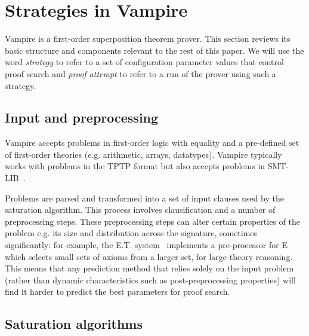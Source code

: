 \documentclass{llncs}
\begin{document}
\section{Strategies in Vampire}
\label{sec:vampire}
%
Vampire is a first-order superposition theorem prover. 
This section reviews its basic structure and components relevant to the rest of this paper. 
We will use the word \textit{strategy} to refer to a set of configuration parameter values that control proof search and \textit{proof attempt} to refer to a run of the prover using such a strategy.

\subsection{Input and preprocessing}

Vampire accepts problems in first-order logic with equality and a pre-defined set of first-order theories (e.g. arithmetic, arrays, datatypes). Vampire typically works with problems in the TPTP format \cite{TPTP} but also accepts problems in SMT-LIB~\cite{smt-lib}. 

Problems are parsed and transformed into a set of input clauses used by the saturation algorithm.
This process involves clausification and a number of preprocessing steps.
These preprocessing steps can alter certain properties of the problem e.g. its size and distribution across the signature, sometimes significantly: for example, the E.T. system~\cite{ET} implements a pre-processor for E which selects small sets of axioms from a larger set, for large-theory reasoning.
This means that any prediction method that relies solely on the input problem (rather than dynamic characteristics such as post-preprocessing properties) will find it harder to predict the best parameters for proof search.


\subsection{Saturation algorithms}
\end{document}
